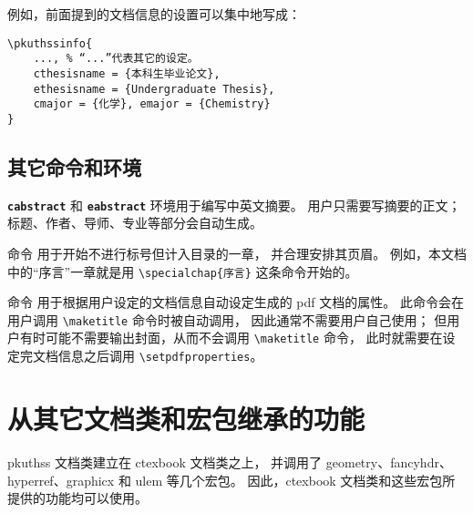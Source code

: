 例如，前面提到的文档信息的设置可以集中地写成：
\begin{Verbatim}[frame = single, tabsize = 4]
\pkuthssinfo{
	..., % “...”代表其它的设定。
	cthesisname = {本科生毕业论文},
	ethesisname = {Undergraduate Thesis},
	cmajor = {化学}, emajor = {Chemistry}
}
\end{Verbatim}

\subsection{其它命令和环境}\label{ssec:misc}

\texttt{\bfseries cabstract} 和 \texttt{\bfseries eabstract}
环境用于编写中英文摘要。
用户只需要写摘要的正文；标题、作者、导师、专业等部分会自动生成。

\texttt{\bfseries\string\specialchap} 命令
用于开始不进行标号但计入目录的一章，
并合理安排其页眉。%
例如，本文档中的“序言”一章就是用 \verb|\specialchap{序言}|
这条命令开始的。%

\texttt{\bfseries\string\setpdfproperties} 命令
用于根据用户设定的文档信息自动设定生成的 pdf 文档的属性。
此命令会在用户调用 \verb|\maketitle| 命令时被自动调用，
因此通常不需要用户自己使用；
但用户有时可能不需要输出封面，从而不会调用 \verb|\maketitle| 命令，
此时就需要在设定完文档信息之后调用 \verb|\setpdfproperties|。%

\section{从其它文档类和宏包继承的功能}\label{sec:thirdparty}

pkuthss 文档类建立在 ctexbook\supercite{ctex} 文档类之上，
并调用了 geometry\supercite{geometry}、fancyhdr\supercite{fancyhdr}、%
hyperref\supercite{hyperref}、graphicx\supercite{graphicx}
和 ulem\supercite{ulem} 等几个宏包。
因此，ctexbook 文档类和这些宏包所提供的功能均可以使用。

